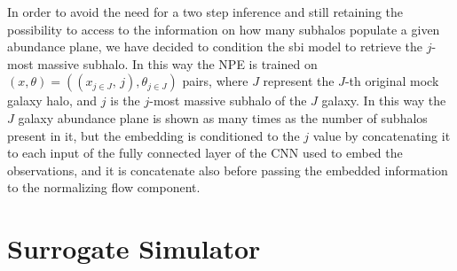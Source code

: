 In order to avoid the need for a two step inference and still retaining the possibility to access to the information on how many subhalos populate a given abundance plane, we have decided to condition the sbi model to retrieve the $j$-most massive subhalo. In this way the NPE is trained on $(x, \theta) = ((x_{j \in J}, \, j), \theta_{j \in J})$ pairs, where $J$ represent the $J$-th original mock galaxy halo, and $j$ is the  $j$-most massive subhalo of the $J$ galaxy. In this way the $J$ galaxy abundance plane is shown as many times as the number of subhalos present in it, but the embedding is conditioned to the $j$ value by concatenating it to each input of the fully connected layer of the CNN used to embed the observations, and it is concatenate also before passing the embedded information to the normalizing flow component. 

\section{Surrogate Simulator}
